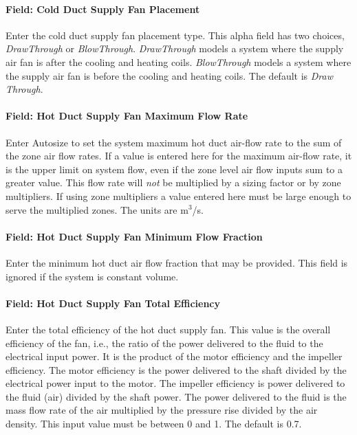\paragraph{Field: Cold Duct Supply Fan Placement}\label{field-cold-duct-supply-fan-placement}

Enter the cold duct supply fan placement type. This alpha field has two choices, \emph{DrawThrough} or \emph{BlowThrough}. \emph{DrawThrough} models a system where the supply air fan is after the cooling and heating coils. \emph{BlowThrough} models a system where the supply air fan is before the cooling and heating coils. The default is \emph{Draw Through}.

\paragraph{Field: Hot Duct Supply Fan Maximum Flow Rate}\label{field-hot-duct-supply-fan-maximum-flow-rate}

Enter Autosize to set the system maximum hot duct air-flow rate to the sum of the zone air flow rates. If a value is entered here for the maximum air-flow rate, it is the upper limit on system flow, even if the zone level air flow inputs sum to a greater value. This flow rate will \emph{not} be multiplied by a sizing factor or by zone multipliers. If using zone multipliers a value entered here must be large enough to serve the multiplied zones. The units are m\(^{3}\)/s.

\paragraph{Field: Hot Duct Supply Fan Minimum Flow Fraction}\label{field-hot-duct-supply-fan-minimum-flow-fraction}

Enter the minimum hot duct air flow fraction that may be provided. This field is ignored if the system is constant volume.

\paragraph{Field: Hot Duct Supply Fan Total Efficiency}\label{field-hot-duct-supply-fan-total-efficiency}

Enter the total efficiency of the hot duct supply fan. This value is the overall efficiency of the fan, i.e., the ratio of the power delivered to the fluid to the electrical input power. It is the product of the motor efficiency and the impeller efficiency. The motor efficiency is the power delivered to the shaft divided by the electrical power input to the motor. The impeller efficiency is power delivered to the fluid (air) divided by the shaft power. The power delivered to the fluid is the mass flow rate of the air multiplied by the pressure rise divided by the air density. This input value must be between 0 and 1. The default is 0.7.

